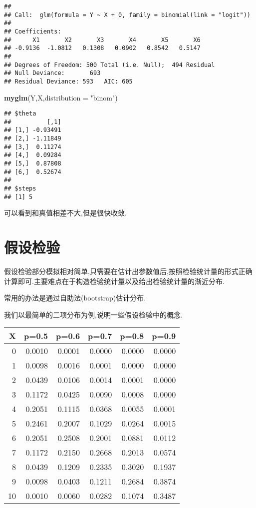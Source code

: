 \documentclass[]{ctexbook}
\newenvironment{Shaded}{\begin{snugshade}}{\end{snugshade}}
\newcommand{\DataTypeTok}[1]{\textcolor[rgb]{0.13,0.29,0.53}{#1}}
\newcommand{\KeywordTok}[1]{\textcolor[rgb]{0.13,0.29,0.53}{\textbf{#1}}}
\newcommand{\NormalTok}[1]{#1}
\newcommand{\StringTok}[1]{\textcolor[rgb]{0.31,0.60,0.02}{#1}}
\begin{document}
\begin{verbatim}
## 
## Call:  glm(formula = Y ~ X + 0, family = binomial(link = "logit"))
## 
## Coefficients:
##      X1       X2       X3       X4       X5       X6  
## -0.9136  -1.0812   0.1308   0.0902   0.8542   0.5147  
## 
## Degrees of Freedom: 500 Total (i.e. Null);  494 Residual
## Null Deviance:       693 
## Residual Deviance: 593   AIC: 605
\end{verbatim}

\begin{Shaded}
\begin{Highlighting}[]
\KeywordTok{myglm}\NormalTok{(Y,X,}\DataTypeTok{distribution  =} \StringTok{"binom"}\NormalTok{)}
\end{Highlighting}
\end{Shaded}

\begin{verbatim}
## $theta
##          [,1]
## [1,] -0.93491
## [2,] -1.11849
## [3,]  0.11274
## [4,]  0.09284
## [5,]  0.87808
## [6,]  0.52674
## 
## $steps
## [1] 5
\end{verbatim}

可以看到和真值相差不大,但是很快收敛.

\hypertarget{section-10}{%
\chapter{假设检验}\label{section-10}}

假设检验部分模拟相对简单,只需要在估计出参数值后,按照检验统计量的形式正确计算即可.主要难点在于构造检验统计量以及给出检验统计量的渐近分布.

常用的办法是通过自助法(bootstrap)估计分布.

我们以最简单的二项分布为例,说明一些假设检验中的概念.

\begin{tabular}{r|r|r|r|r|r}
\hline
X & p=0.5 & p=0.6 & p=0.7 & p=0.8 & p=0.9\\
\hline
0 & 0.0010 & 0.0001 & 0.0000 & 0.0000 & 0.0000\\
\hline
1 & 0.0098 & 0.0016 & 0.0001 & 0.0000 & 0.0000\\
\hline
2 & 0.0439 & 0.0106 & 0.0014 & 0.0001 & 0.0000\\
\hline
3 & 0.1172 & 0.0425 & 0.0090 & 0.0008 & 0.0000\\
\hline
4 & 0.2051 & 0.1115 & 0.0368 & 0.0055 & 0.0001\\
\hline
5 & 0.2461 & 0.2007 & 0.1029 & 0.0264 & 0.0015\\
\hline
6 & 0.2051 & 0.2508 & 0.2001 & 0.0881 & 0.0112\\
\hline
7 & 0.1172 & 0.2150 & 0.2668 & 0.2013 & 0.0574\\
\hline
8 & 0.0439 & 0.1209 & 0.2335 & 0.3020 & 0.1937\\
\hline
9 & 0.0098 & 0.0403 & 0.1211 & 0.2684 & 0.3874\\
\hline
10 & 0.0010 & 0.0060 & 0.0282 & 0.1074 & 0.3487\\
\hline
\end{tabular}
\end{document}
